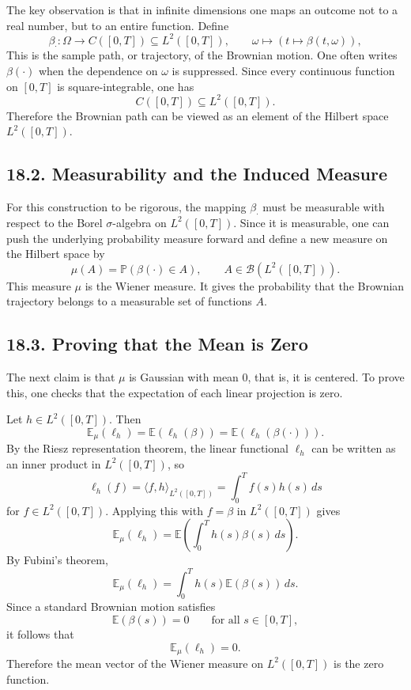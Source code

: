 \documentclass[11pt]{article}
\theoremstyle{definition}
\theoremstyle{remark}
\begin{document}
The key observation is that in infinite dimensions one maps an outcome not to a real number, but to an entire function. Define
\[
\beta_{\cdot}:\Omega\to C([0,T])\subseteq L^2([0,T]),
\qquad
\omega\mapsto (t\mapsto \beta(t,\omega)),
\]
This is the sample path, or trajectory, of the Brownian motion. One often writes $\beta(\cdot)$ when the dependence on $\omega$ is suppressed. Since every continuous function on $[0,T]$ is square-integrable, one has
\[
C([0,T])\subseteq L^2([0,T]).
\]
Therefore the Brownian path can be viewed as an element of the Hilbert space $L^2([0,T])$.

\subsection*{18.2. Measurability and the Induced Measure}
For this construction to be rigorous, the mapping $\beta_{\cdot}$ must be measurable with respect to the Borel $\sigma$-algebra on $L^2([0,T])$. Since it is measurable, one can push the underlying probability measure forward and define a new measure on the Hilbert space by
\[
\mu(A)=\mathbb P(\beta(\cdot)\in A),
\qquad
A\in \mathcal B(L^2([0,T])).
\]
This measure $\mu$ is the Wiener measure. It gives the probability that the Brownian trajectory belongs to a measurable set of functions $A$.

\subsection*{18.3. Proving that the Mean is Zero}
The next claim is that $\mu$ is Gaussian with mean $0$, that is, it is centered. To prove this, one checks that the expectation of each linear projection is zero.

Let $h\in L^2([0,T])$. Then
\[
\mathbb E_{\mu}(\ell_h)
=
\mathbb E(\ell_h(\beta))
=
\mathbb E(\ell_h(\beta(\cdot))).
\]
By the Riesz representation theorem, the linear functional $\ell_h$ can be written as an inner product in $L^2([0,T])$, so
\[
\ell_h(f)=\langle f,h\rangle_{L^2([0,T])}=\int_0^T f(s)h(s)\,ds
\]
for $f\in L^2([0,T])$. Applying this with $f=\beta$ in $L^2([0,T])$ gives
\[
\mathbb E_{\mu}(\ell_h)
=
\mathbb E\left(\int_0^T h(s)\beta(s)\,ds\right).
\]
By Fubini's theorem,
\[
\mathbb E_{\mu}(\ell_h)
=
\int_0^T h(s)\mathbb E(\beta(s))\,ds.
\]
Since a standard Brownian motion satisfies
\[
\mathbb E(\beta(s))=0
\qquad \text{for all } s\in[0,T],
\]
it follows that
\[
\mathbb E_{\mu}(\ell_h)=0.
\]
Therefore the mean vector of the Wiener measure on $L^2([0,T])$ is the zero function.
\end{document}
